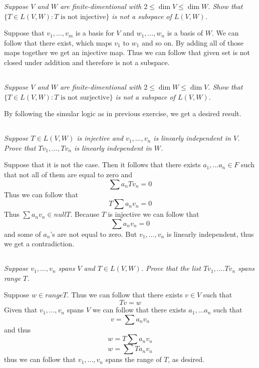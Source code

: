 \documentclass[11pt,oneside,titlepage]{book}
\begin{document}
\textit{Suppose $V$ and $W$ are finite-dimentional with $2 \leq \dim V \leq \dim W$.
  Show that $\{T \in L(V, W): T \text{ is not injective}\}$ is not a subspace of $L(V, W)$.}

Suppose that $v_1, ..., v_m$ is a basis for $V$ and $w_1, ..., w_n$ is a basis of $W$.
We can follow that there exist, which maps $v_1$ to $w_1$ and so on. By adding all of
those maps together we get an injective map. Thus we can follow that given set is not
closed under addition and therefore is not a subspace.

\subsection{}

\textit{Suppose $V$ and $W$ are finite-dimentional with $2 \leq \dim W \leq \dim V$.
  Show that $\{T \in L(V, W): T \text{ is not surjective}\}$ is not a subspace of $L(V, W)$.}

By following the simular logic as in previous exercise, we get a desired result.

\subsection{}

\textit{Suppose $T \in L(V, W)$ is injective and $v_1, ..., v_n$ is linearly independent
  in $V$. Prove that $Tv_1, ..., Tv_n$ is linearly independent in $W$.}

Suppose that it is not the case. Then it follows that there exists $a_1, ... a_n \in F$ such
that not all of them are equal to zero and 
$$\sum a_n T v_n = 0$$
Thus we can follow that
$$T \sum a_n v_n = 0$$
Thus $\sum a_n v_n \in null T$. Because $T$ is injective we can follow that
$$\sum a_n v_n = 0$$
and some of $a_n$'s are not equal to zero. But $v_1, ..., v_n$ is linearly independent, thus
we get a contradiction.

\subsection{}

\textit{Suppose $v_1, ..., v_n$ spans $V$ and $T \in L(V, W)$. Prove that the list
  $T v_1, .... Tv_n$ spans range $T$.}

Suppose $w \in range T$. Thus we can follow that there exists $v \in V$ such that
$$Tv = w$$
Given that $v_1, ..., v_n$ spans $V$ we can follow that there exists $a_1, ... a_n$ such that
$$v = \sum a_n v_n$$
and thus
$$w = T \sum a_n v_n$$
$$w =  \sum T a_n v_n$$
thus we can follow that $v_1, ..., v_n$ spans the range of $T$, as desired.
\end{document}
